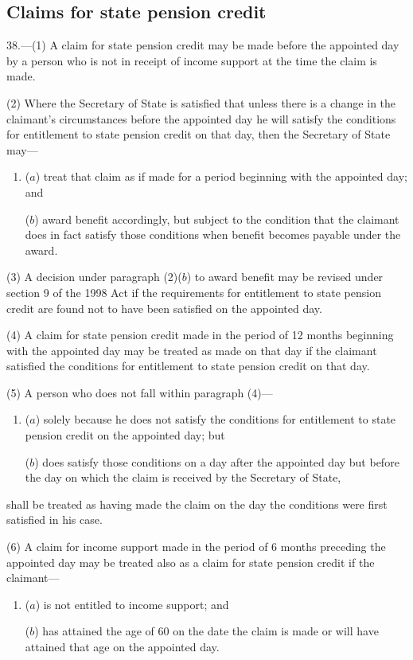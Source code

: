 \documentclass[12pt,a4paper]{article}
\begin{document}
\subsection[38. Claims for state pension credit]{Claims for state pension credit}

38.---(1)  A claim for state pension credit may be made before the appointed day by a person who is not in receipt of income support at the time the claim is made.

(2) Where the Secretary of State is satisfied that unless there is a change in the claimant’s circumstances before the appointed day he will satisfy the conditions for entitlement to state pension credit on that day, then the Secretary of State may—
\begin{enumerate}\item[]
($a$) treat that claim as if made for a period beginning with the appointed day; and

($b$) award benefit accordingly, but subject to the condition that the claimant does in fact satisfy those conditions when benefit becomes payable under the award.
\end{enumerate}

(3) A decision under paragraph (2)($b$)  to award benefit may be revised under section 9 of the 1998 Act if the requirements for entitlement to state pension credit are found not to have been satisfied on the appointed day.

(4) A claim for state pension credit made in the period of 12 months beginning with the appointed day may be treated as made on that day if the claimant satisfied the conditions for entitlement to state pension credit on that day.

(5) A person who does not fall within paragraph (4)—
\begin{enumerate}\item[]
($a$) solely because he does not satisfy the conditions for entitlement to state pension credit on the appointed day; but

($b$) does satisfy those conditions on a day after the appointed day but before the day on which the claim is received by the Secretary of State,
\end{enumerate}
shall be treated as having made the claim on the day the conditions were first satisfied in his case.

(6) A claim for income support made in the period of 6 months preceding the appointed day may be treated also as a claim for state pension credit if the claimant—
\begin{enumerate}\item[]
($a$) is not entitled to income support; and

($b$) has attained the age of 60 on the date the claim is made or will have attained that age on the appointed day.
\end{enumerate}
\end{document}
